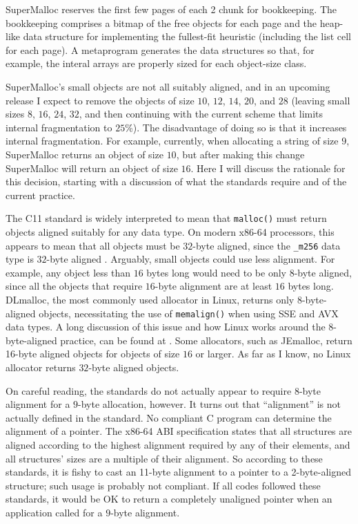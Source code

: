 \documentclass[natbib,sort&compress,10pt]{sigplanconf}
\newcommand{\code}[1]{\texttt{#1}}
\begin{document}
SuperMalloc reserves the first few pages of each \unit{2}\mebi\byte{}
chunk for bookkeeping.  The bookkeeping comprises a bitmap of the free
objects for each page and the heap-like data structure for
implementing the fullest-fit heuristic (including the list cell for
each page).  A metaprogram generates the data structures so that, for
example, the interal arrays are properly sized for each object-size
class.

SuperMalloc's small objects are not all suitably aligned, and in an
upcoming release I expect to remove the objects of size $10$, $12$,
$14$, $20$, and $28$ (leaving small sizes $8$, $16$, $24$, $32$, and
then continuing with the current scheme that limits internal
fragmentation to $25$\%).  The disadvantage of doing so is that it
increases internal fragmentation.  For example, currently, when
allocating a string of size $9$, SuperMalloc returns an object of size
$10$, but after making this change SuperMalloc will return an object
of size $16$.  Here I will discuss the rationale for this decision,
starting with a discussion of what the standards require and of the
current practice.

The C11 standard \cite{ISOIEC11} is widely interpreted to mean that
\code{malloc()} must return objects aligned suitably for any data
type. On modern x86-64 processors, this appears to mean that all
objects must be $32$-byte aligned, since the \code{\_m256} data type
is $32$-byte aligned \cite{MatzHuJa07}.  Arguably, small objects could
use less alignment.  For example, any object less than $16$ bytes long
would need to be only 8-byte aligned, since all the objects that
require $16$-byte alignment are at least $16$ bytes long.  DLmalloc,
the most commonly used allocator in Linux, returns only 8-byte-aligned
objects, necessitating the use of \code{memalign()} when using SSE and
AVX data types.  A long discussion of this issue and how Linux works
around the 8-byte-aligned practice, can be found at \cite{Schanda04}.
Some allocators, such as JEmalloc, return 16-byte aligned objects for
objects of size $16$ or larger.  As far as I know, no Linux allocator
returns $32$-byte aligned objects.

On careful reading, the standards \cite{ISOIEC11, MatzHuJa07} do not
actually appear to require $8$-byte alignment for a $9$-byte
allocation, however.  It turns out that ``alignment'' is not actually
defined in the standard.  No compliant C program can determine the
alignment of a pointer.  The x86-64 ABI specification
\cite{MatzHuJa07} states that all structures are aligned according to
the highest alignment required by any of their elements, and all
structures' sizes are a multiple of their alignment.  So according to
these standards, it is fishy to cast an 11-byte alignment to a pointer
to a 2-byte-aligned structure; such usage is probably not compliant.
If all codes followed these standards, it would be OK to return a
completely unaligned pointer when an application called for a $9$-byte
alignment.
\end{document}
